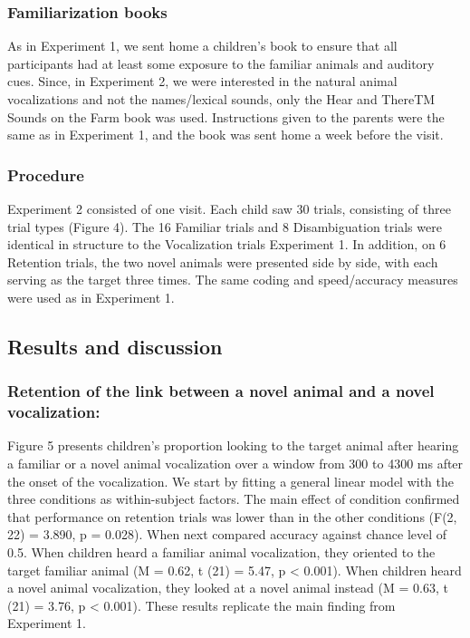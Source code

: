 \documentclass[english,floatsintext,man]{apa6}
\theoremstyle{definition}
\theoremstyle{definition}
\theoremstyle{definition}
\theoremstyle{remark}
\begin{document}
\subsubsection{Familiarization books}\label{familiarization-books-1}

As in Experiment 1, we sent home a children's book to ensure that all
participants had at least some exposure to the familiar animals and
auditory cues. Since, in Experiment 2, we were interested in the natural
animal vocalizations and not the names/lexical sounds, only the Hear and
ThereTM Sounds on the Farm book was used. Instructions given to the
parents were the same as in Experiment 1, and the book was sent home a
week before the visit.

\subsubsection{Procedure}\label{procedure-1}

Experiment 2 consisted of one visit. Each child saw 30 trials,
consisting of three trial types (Figure 4). The 16 Familiar trials and 8
Disambiguation trials were identical in structure to the Vocalization
trials Experiment 1. In addition, on 6 Retention trials, the two novel
animals were presented side by side, with each serving as the target
three times. The same coding and speed/accuracy measures were used as in
Experiment 1.

\subsection{Results and discussion}\label{results-and-discussion-1}

\subsubsection{Retention of the link between a novel animal and a novel
vocalization:}\label{retention-of-the-link-between-a-novel-animal-and-a-novel-vocalization}

Figure 5 presents children's proportion looking to the target animal
after hearing a familiar or a novel animal vocalization over a window
from 300 to 4300 ms after the onset of the vocalization. We start by
fitting a general linear model with the three conditions as
within-subject factors. The main effect of condition confirmed that
performance on retention trials was lower than in the other conditions
(F(2, 22) = 3.890, p = 0.028). When next compared accuracy against
chance level of 0.5. When children heard a familiar animal vocalization,
they oriented to the target familiar animal (M = 0.62, t (21) = 5.47, p
\textless{} 0.001). When children heard a novel animal vocalization,
they looked at a novel animal instead (M = 0.63, t (21) = 3.76, p
\textless{} 0.001). These results replicate the main finding from
Experiment 1.
\end{document}
